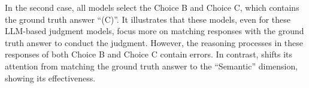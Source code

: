 In the second case, all models select the Choice B and Choice C, which contains the ground truth answer ``(C)''. It illustrates that these models, even for these LLM-based judgment models, focus more on matching responses with the ground truth answer to conduct the judgment. However, the reasoning processes in these responses of both Choice B and Choice C contain errors. In contrast, \method{} shifts its attention from matching the ground truth answer to the ``Semantic'' dimension, showing its effectiveness.
